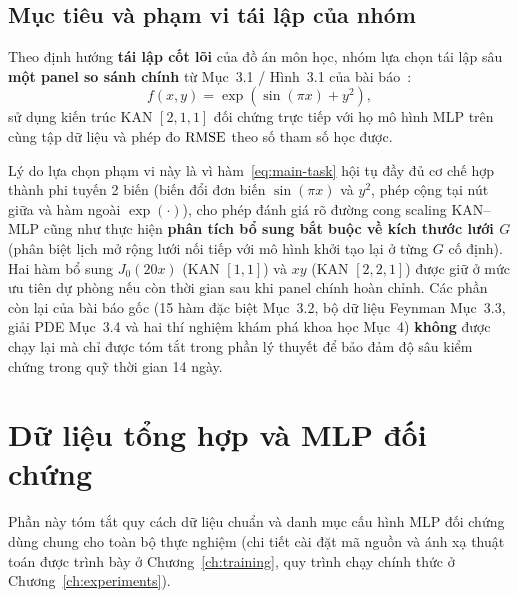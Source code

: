 \subsection{Mục tiêu và phạm vi tái lập của nhóm}
Theo định hướng \textbf{tái lập cốt lõi} của đồ án môn học, nhóm lựa chọn tái lập sâu \textbf{một panel so sánh chính} từ Mục~3.1 / Hình~3.1 của bài báo~\cite{liu2025kan}:
\begin{equation}\label{eq:main-task}
f(x,y) = \exp\!\left(\sin(\pi x) + y^2\right),
\end{equation}
sử dụng kiến trúc KAN $[2, 1, 1]$ đối chứng trực tiếp với họ mô hình MLP trên cùng tập dữ liệu và phép đo $\operatorname{RMSE}$ theo số tham số học được.

Lý do lựa chọn phạm vi này là vì hàm~\eqref{eq:main-task} hội tụ đầy đủ cơ chế hợp thành phi tuyến 2 biến (biến đổi đơn biến $\sin(\pi x)$ và $y^2$, phép cộng tại nút giữa và hàm ngoài $\exp(\cdot)$), cho phép đánh giá rõ đường cong scaling KAN--MLP cũng như thực hiện \textbf{phân tích bổ sung bắt buộc về kích thước lưới $G$} (phân biệt lịch mở rộng lưới nối tiếp với mô hình khởi tạo lại ở từng $G$ cố định). Hai hàm bổ sung $J_0(20x)$ (KAN $[1,1]$) và $xy$ (KAN $[2,2,1]$) được giữ ở mức ưu tiên dự phòng nếu còn thời gian sau khi panel chính hoàn chỉnh. Các phần còn lại của bài báo gốc (15 hàm đặc biệt Mục~3.2, bộ dữ liệu Feynman Mục~3.3, giải PDE Mục~3.4 và hai thí nghiệm khám phá khoa học Mục~4) \textbf{không} được chạy lại mà chỉ được tóm tắt trong phần lý thuyết để bảo đảm độ sâu kiểm chứng trong quỹ thời gian 14 ngày.

\section{Dữ liệu tổng hợp và MLP đối chứng}
Phần này tóm tắt quy cách dữ liệu chuẩn và danh mục cấu hình MLP đối chứng dùng chung cho toàn bộ thực nghiệm (chi tiết cài đặt mã nguồn và ánh xạ thuật toán được trình bày ở Chương~\ref{ch:training}, quy trình chạy chính thức ở Chương~\ref{ch:experiments}).

